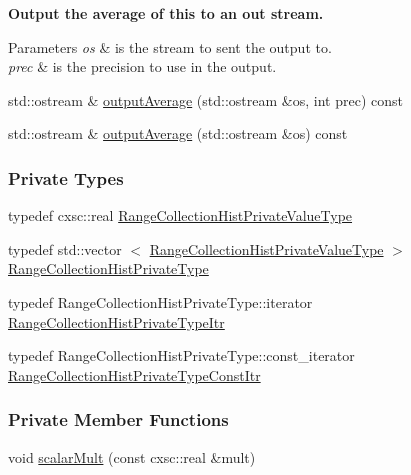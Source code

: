\begin{Indent}{\bf \-Output the average of this to an out stream.}\par
{\em 
\begin{DoxyParams}{\-Parameters}
{\em os} & is the stream to sent the output to. \\
\hline
{\em prec} & is the precision to use in the output. \\
\hline
\end{DoxyParams}
}\begin{DoxyCompactItemize}
\item 
std\-::ostream \& \hyperlink{classsubpavings_1_1RangeCollectionHist_a1c9864fdfb7362224f3842631d8ce9b7}{output\-Average} (std\-::ostream \&os, int prec) const 
\item 
std\-::ostream \& \hyperlink{classsubpavings_1_1RangeCollectionHist_a807af4e295c8fb507e29819e05e1ac9e}{output\-Average} (std\-::ostream \&os) const 
\end{DoxyCompactItemize}
\end{Indent}
\subsubsection*{\-Private \-Types}
\begin{DoxyCompactItemize}
\item 
typedef cxsc\-::real \hyperlink{classsubpavings_1_1RangeCollectionHist_a48c339f8bcabae3f0ecd9a0b08211e54}{\-Range\-Collection\-Hist\-Private\-Value\-Type}
\item 
typedef std\-::vector\*
$<$ \hyperlink{classsubpavings_1_1RangeCollectionHist_a48c339f8bcabae3f0ecd9a0b08211e54}{\-Range\-Collection\-Hist\-Private\-Value\-Type} $>$ \hyperlink{classsubpavings_1_1RangeCollectionHist_ab3b0321ac69a063bda1c70cdb9bf00ec}{\-Range\-Collection\-Hist\-Private\-Type}
\item 
typedef \*
\-Range\-Collection\-Hist\-Private\-Type\-::iterator \hyperlink{classsubpavings_1_1RangeCollectionHist_a6e8c17437030654fc20d5d341897e806}{\-Range\-Collection\-Hist\-Private\-Type\-Itr}
\item 
typedef \*
\-Range\-Collection\-Hist\-Private\-Type\-::const\-\_\-iterator \hyperlink{classsubpavings_1_1RangeCollectionHist_acb2f5e2dbcc99b2efcb6bb62f010574e}{\-Range\-Collection\-Hist\-Private\-Type\-Const\-Itr}
\end{DoxyCompactItemize}
\subsubsection*{\-Private \-Member \-Functions}
\begin{DoxyCompactItemize}
\item 
void \hyperlink{classsubpavings_1_1RangeCollectionHist_aca4bb8b2394285f14ec9af829f55d5c9}{scalar\-Mult} (const cxsc\-::real \&mult)
\end{DoxyCompactItemize}
